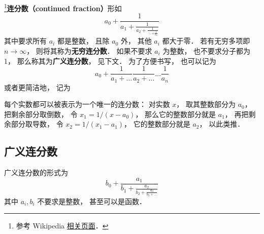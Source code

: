 
\footnote{参考 Wikipedia \href{https://en.wikipedia.org/wiki/Continued_fraction}{相关页面}．}\textbf{连分数（continued fraction）}形如
\begin{equation}
a_0 + \frac{1}{\displaystyle a_1 + \frac{1}{\displaystyle a_2 + \frac{1}{\displaystyle \ddots + \frac{1}{a_n}}}}
\end{equation}
其中要求所有 $a_i$ 都是整数， 且除 $a_0$ 外， 其他 $a_i$ 都大于零． 若有无穷多项即 $n\to\infty$， 则将其称为\textbf{无穷连分数}． 如果不要求 $a_i$ 为整数， 也不要求分子都为 1， 那么称其为\textbf{广义连分数}， 见下文． 为了方便书写， 也可以记为
\begin{equation}
a_0 + \frac{1}{a_1 + \dots}\frac{1}{a_2 + \dots}\dots \frac{1}{a_n}
\end{equation}
或者更简洁地， 记为
\begin{equation}
[a_0;\ a_1,\ a_2,\ \dots\ ,\ a_n]
\end{equation}

每个实数都可以被表示为一个唯一的连分数： 对实数 $x$， 取其整数部分为 $a_0$， 把剩余部分取倒数， 令 $x_1 = 1/(x-a_0)$， 那么它的整数部分就是 $a_1$， 再把剩余部分取导数， 令 $x_2 = 1/(x_1 - a_1)$， 它的整数部分就是 $a_2$， 以此类推．

\subsection{广义连分数}
广义连分数的形式为
\begin{equation}
b_0 + \frac{a_1}{\displaystyle b_1 + \frac{a_2}{\displaystyle b_2 + \frac{a_3}{\displaystyle b_3 + \dots}}}
\end{equation}
其中 $a_i, b_i$ 不要求是整数， 甚至可以是函数．
